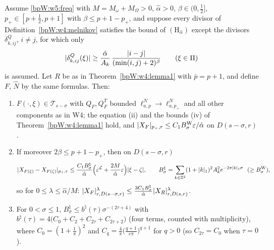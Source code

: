 \begin{lemma}\label{bpW:w5:w4-modified}
Assume \eqref{bpW:w5:freq} with $M=M_\omega+M_\Omega>0$, $\hat\alpha>0$, $\beta\in(0,\frac12]$, $p_+\in[p+\frac12,p+1]$
with $\beta\le p+1-p_+$, and suppose every divisor of Definition~\ref{bpW:w4:melnikov} satisfies the bound of
$(\mathrm H_{\hat\alpha})$ except the divisors $\delta^Q_{k,ij}$, $i\ne j$, for which only
\begin{equation}\label{bpW:w5:modified}
\lvert \delta^Q_{k,ij}(\xi)\rvert\ge\frac{\hat\alpha}{A_k}\,\frac{\lvert i-j\rvert}{(\min(i,j)+2)^{\beta}}\qquad(\xi\in\Pi)
\end{equation}
is assumed. Let $R$ be as in Theorem~\ref{bpW:w4:lemma1} with $\bar p=p+1$, and define $F$, $\hat N$ by the same
formulas. Then:
\begin{enumerate}[label=(\roman*)]
\item $F(\cdot,\xi)\in\mathcal T_{s-\sigma}$ with $Q_F,Q_F^T$ bounded $\ell^N_{a,p}\to\ell^N_{a,p_+}$ and all other
  components as in W4; the equation (ii) and the bounds (iv) of Theorem~\ref{bpW:w4:lemma1} hold, and
  $\lvert X_F\rvert_{p_+,r}\le C_1B^{\rm W}_\sigma\varepsilon/\hat\alpha$ on $D(s-\sigma,r)$.
\item If moreover $2\beta\le p+1-p_+$, then on $D(s-\sigma,r)$
  \[\lvert X_{F(\xi)}-X_{F(\zeta)}\rvert_{p_+,r}\le\frac{C_1B^\natural_\sigma}{\hat\alpha}\Bigl(\varepsilon^{\mathcal L}+\frac{2M}{\hat\alpha}\varepsilon\Bigr)\lvert \xi-\zeta\rvert,
  \qquad B^\natural_\sigma=\sum_{k\in\mathbb{Z}^2}(1+\lvert k\rvert_1)^2A_k^2e^{-2\pi\lvert k\rvert_1\sigma}\ \ (\ge B^{\rm W}_\sigma),\]
  so for $0\le\lambda\le\hat\alpha/M$: $\lvert X_F\rvert^\lambda_{r,D(s-\sigma,r)}\le\frac{3C_1B^\natural_\sigma}{\hat\alpha}\lvert X_R\rvert^\lambda_{r,D(s,r)}$.
\item For $0<\sigma\le1$, $B^\natural_\sigma\le b^\natural(\tau)\sigma^{-(2\tau+4)}$ with
  $b^\natural(\tau)=4\bigl(C_0+C_2+C_{2\tau}+C_{2\tau+2}\bigr)$ (four terms, counted with multiplicity), where
  $C_0=(1+\frac1\pi)^2$ and $C_q=\frac4\pi\bigl(\frac{q+1}{e\pi}\bigr)^{q+1}$ for $q>0$ (so $C_{2\tau}=C_0$ when $\tau=0$).
\end{enumerate}
\end{lemma}
